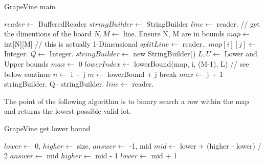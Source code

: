 \documentclass[12pt]{article}
\begin{document}
\begin{algorithm}[H]
\caption{GrapeVine main}
\begin{algorithmic}
        \State $reader \gets$ BufferedReader
        \State $stringBuilder \gets$ StringBuilder
        \State $line \gets$ reader.
            // get the dimentions of the board
            \State $N, M \gets$  line.
            \State Ensure N, M are in bounds
            \State $map \gets$ int[N][M] // this is actually 1-Dimensional
                \State $splitLine \gets$ reader..
                    \State $map[i][j] \gets$ Integer.
                \EndFor
            \EndFor
            \State $Q \gets$ Integer.
            \State $stringBuilder \gets$ new StringBuilder()
                \State $L, U \gets$ Lower and Upper bounds
                \State $max \gets$ 0
                    \State $lowerIndex \gets$ lowerBound(map, i, (M-1), L) // see below
                        \State continue
                    \EndIf
                        \State $n \gets$ i + j
                        \State $m \gets$ lowerBound + j
                            \State break
                        \EndIf
                            \State $max \gets$ j + 1
                        \EndIf
                    \EndFor
                \EndFor
                \State stringBuilder.
                \State Q--
            \EndWhile
            \State stringBuilder.
            \State $line \gets$ reader.
        \EndWhile
    \EndProcedure
\end{algorithmic}
\end{algorithm}

\newpage

The point of the following algorithm is to binary search a row within
the map and returns the lowest possible valid lot.

\begin{algorithm}[H]
\caption{GrapeVine get lower bound}
\begin{algorithmic}
        \State $lower \gets$ 0, $higher \gets$ size, $answer \gets$ -1, mid
            \State $mid \gets$ lower + (higher - lower) / 2
                \State $answer \gets$ mid
                \State $higher \gets$ mid - 1
            \Else
                \State $lower \gets$ mid + 1
            \EndIf
        \EndWhile
    \EndProcedure
\end{algorithmic}
\end{algorithm}
\end{document}

